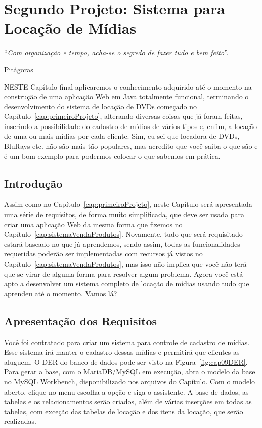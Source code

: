 \chapter{Segundo Projeto: Sistema para Locação de Mídias}\label{cap:segundoProjeto}
\epigraph{``\textit{Com organização e tempo, acha-se o segredo de fazer tudo e bem feito}''.}{Pitágoras}

\lettrine[lines=4, lhang=0.1, lraise=0, loversize=0.2, findent=0.1em]{\textcolor{corTema}{N}}{ESTE} Capítulo final aplicaremos o conhecimento adquirido até o momento na construção de uma aplicação Web em Java totalmente funcional, terminando o desenvolvimento do sistema de locação de DVDs começado no Capítulo~\ref{cap:primeiroProjeto}, alterando diversas coisas que já foram feitas, inserindo a possibilidade do cadastro de mídias de vários tipos e, enfim, a locação de uma ou mais mídias por cada cliente. Sim, eu sei que locadora de DVDs, BluRays etc. não são mais tão populares, mas acredito que você saiba o que são e é um bom exemplo para podermos colocar o que sabemos em prática.


\section{Introdução}

Assim como no Capítulo~\ref{cap:primeiroProjeto}, neste Capítulo será apresentada uma série de requisitos, de forma muito simplificada, que deve ser usada para criar uma aplicação Web da mesma forma que fizemos no Capítulo~\ref{cap:sistemaVendaProdutos}. Novamente, tudo que será requisitado estará baseado no que já aprendemos, sendo assim, todas as funcionalidades requeridas poderão ser implementadas com recursos já vistos no Capítulo~\ref{cap:sistemaVendaProdutos}, mas isso não implica que você não terá que se virar de alguma forma para resolver algum problema. Agora você está apto a desenvolver um sistema completo de locação de mídias usando tudo que aprendeu até o momento. Vamos lá?


\section{Apresentação dos Requisitos}

Você foi contratado para criar um sistema para controle de cadastro de mídias. Esse sistema irá manter o cadastro dessas mídias e permitirá que clientes as aluguem. O DER do banco de dados pode ser visto na Figura~\ref{fig:cap09DER}. Para gerar a base, com o MariaDB/MySQL em execução, abra o modelo da base no MySQL Workbench, disponibilizado nos arquivos do Capítulo. Com o modelo aberto, clique no menu  escolha a opção  e siga o assistente. A base de dados, as tabelas e os relacionamentos serão criados, além de várias inserções em todas as tabelas, com exceção das tabelas de locação e dos itens da locação, que serão realizadas.

